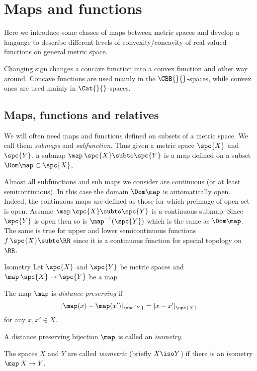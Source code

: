 \chapter{Maps and functions}

Here we introduce some classes of maps between metric spaces and develop a language to describe different levels of convexity/concavity of real-valued functions on general metric space.

Changing sign changes a concave function into a convex function and other way around.
Concave functions are used mainly in the $\CBB{}{}$-spaces,
while convex ones are used  mainly in $\Cat{}{}$-spaces.



\section{Maps, functions and relatives}

We will often need maps and functions defined on subsets of a metric space. We call them \emph{submaps} and \emph{subfunction}.
Thus given a metric space $\spc{X}$ and $\spc{Y}$, 
a submap $\map\:\spc{X}\subto \spc{Y}$ is a map defined on a subset $\Dom\map\subset \spc{X}$.

Almost all subfunctions and sub maps we consider are continuous (or at least semicontinuous).
In this case the domain $\Dom\map$ is automatically open.
Indeed, the continuous maps are defined as those for which preimage of open set is open.
Assume $\map\:\spc{X}\subto \spc{Y}$ is a continuous submap.
Since $\spc{Y}$ is open then so is $\map^{-1}(\spc{Y})$ 
which is the same as $\Dom \map$.
The same is true for upper and lower semicontinuous functions $f\:\spc{X}\subto \RR$ since it is a continuous function for special topology on $\RR$.

\begin{thm}{Isometry}
Let $\spc{X}$ and $\spc{Y}$ be metric spaces
and $\map\:\spc{X}\to \spc{Y}$ be a map
\begin{subthm}{}
The map $\map$ is \emph{distance preserving} if
$$|\map(x)-\map(x')|_{\spc{Y}}=|x-x'|_{\spc{X}}$$
for any $x,x'\in X$.
\end{subthm}

\begin{subthm}{}
A distance preserving bijection $\map$ is called an \emph{isometry}.
\end{subthm}

\begin{subthm}{}
The spaces $X$ and $Y$ are called \emph{isometric} (briefly $X\iso Y$)
 if there is an isometry  $\map\:X\to Y$.
\end{subthm}

\end{thm}


